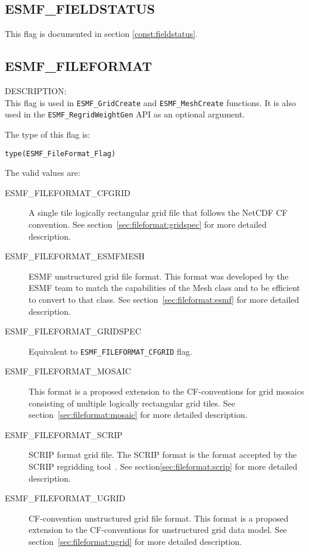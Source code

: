 \subsection{ESMF\_FIELDSTATUS}
This flag is documented in section \ref{const:fieldstatus}.

\subsection{ESMF\_FILEFORMAT}
\label{const:fileformatflag}
{\sf DESCRIPTION:\\}
This flag is used in {\tt ESMF\_GridCreate} and {\tt ESMF\_MeshCreate}
functions.  It is also used in the {\tt ESMF\_RegridWeightGen} API as an
optional argument.

The type of this flag is:

{\tt type(ESMF\_FileFormat\_Flag)}

The valid values are:
\begin{description}
\item [ESMF\_FILEFORMAT\_CFGRID]  A single tile logically rectangular
  grid file that follows the NetCDF CF convention. See section~\ref{sec:fileformat:gridspec} for more detailed description.

\item [ESMF\_FILEFORMAT\_ESMFMESH] ESMF unstructured grid file format. This format was developed by the ESMF team to match the capabilities of the Mesh class and to be efficient to convert to that class. See section~\ref{sec:fileformat:esmf} for more detailed description.

\item [ESMF\_FILEFORMAT\_GRIDSPEC]  Equivalent to {\tt ESMF\_FILEFORMAT\_CFGRID} flag.  

\item [ESMF\_FILEFORMAT\_MOSAIC] This format is a proposed extension to the 
CF-conventions for grid mosaics consisting of multiple logically rectangular grid
tiles. See section~\ref{sec:fileformat:mosaic} for more detailed description.

\item [ESMF\_FILEFORMAT\_SCRIP] SCRIP format grid file. The SCRIP format is
  the format accepted by the SCRIP regridding tool~\cite{ref:SCRIP}.  See section\ref{sec:fileformat:scrip} for more detailed description.

\item [ESMF\_FILEFORMAT\_UGRID] CF-convention unstructured grid file format. This format is a proposed extension to the 
CF-conventions for unstructured grid data model. See section~\ref{sec:fileformat:ugrid} for more detailed description.

\end{description}

